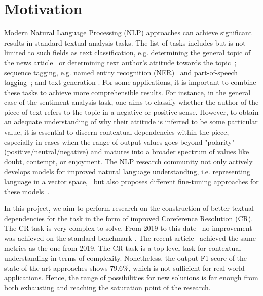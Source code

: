 
\section{Motivation}\label{sec:motication}

Modern Natural Language Processing (NLP) approaches can achieve significant results in standard textual analysis tasks. 
The list of tasks includes but is not limited to such fields as text classification, e.g. determining the general topic of the news article~\cite{text-classification-Altinel2018} or determining text author's attitude towards the topic~\cite{sentiment-analysis-Medhat2014}; sequence tagging,  e.g. named entity recognition (NER)~\cite{ner-Strakova2019,ner-Zhanming2019,ner-Yamada2020,ner-Luoma2020} and part-of-speech tagging~\cite{pos-tagging-Bohnet2018}; and text generation \cite{text-gen-Guo2017}. For some applications, it is important to combine these tasks to achieve more comprehensible results. 
For instance, in the general case of the sentiment analysis task, one aims to classify whether the author of the piece of text refers to the topic in a negative or positive sense. However, to obtain an adequate understanding of why their attitude is inferred to be some particular value, it is essential to discern contextual dependencies within the piece, especially in cases when the range of output values goes beyond "polarity" (positive/neutral/negative) and matures into a broader spectrum of values like doubt, contempt, or enjoyment. 
The NLP research community not only actively develops models for improved natural language understanding, i.e. representing language in a vector space,~\cite{gpt-Radford2018,bert-Devlin2019,xlnet-Yang2020} but also proposes different fine-tuning approaches for these models~\cite{robarta-Liu2019,cr-Joshi2019,gpt2-Radford2019,gpt3-Brown2020}. 

In this project, we aim to perform research on the construction of better textual dependencies for the task in the form of improved Coreference Resolution (CR). 
The CR task is very complex to solve. From 2019 to this date~\cite{cr-Joshi2019} no improvement was achieved on the standard benchmark \cite{ontonotes5-Weischedel2013}. 
The recent article~\cite{cr-Toshniwal2020} achieved the same metrics as the one from 2019. 
The CR task is a top-level task for contextual understanding in terms of complexity. Nonetheless, the output F1 score of the state-of-the-art approaches shows 79.6\%, which is not sufficient for real-world applications. Hence, the range of possibilities for new solutions is far enough from both exhausting and reaching the saturation point of the research.

